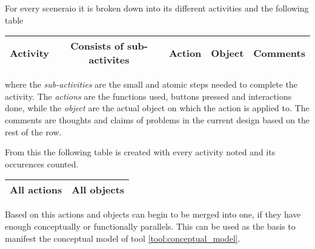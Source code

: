 \begin{method} \label{meth:object-action_analysis} 
  For every sceneraio it is broken down into its different activities and the following table
  \begin{center}
    \begin{tabular}{c|c|c|c|c}
      \hline
      Activity & Consists of sub-activites & Action & Object & Comments
      \\ \hline
    \end{tabular}
  \end{center}
  where the \emph{sub-activities} are the small and atomic steps needed to complete the activity. The \emph{actions} are the functions used, buttons pressed and interactions done, while the \emph{object} are the actual object on which the action is applied to. The comments are thoughts and claims of problems in the current design based on the rest of the row.

  From this the following table is created with every activity noted and its occurences counted.
  \begin{center}
    \begin{tabular}{c|c}
      \hline
      All actions & All objects
      \\ \hline
    \end{tabular}
  \end{center}
  Based on this actions and objects can begin to be merged into one, if they have enough conceptually or functionally parallels. This can be used as the basis to manifest the conceptual model of tool \ref{tool:conceptual_model}. \cite[p 198]{benyon14}
\end{method}